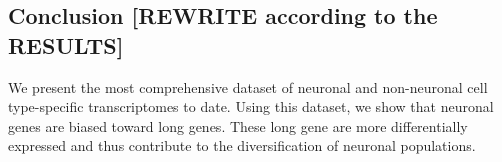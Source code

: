 \subsection{Conclusion [REWRITE according to the RESULTS]}
We present the most comprehensive dataset of neuronal and non-neuronal cell type-specific transcriptomes to date. Using this dataset, we show that neuronal genes are biased toward long genes. These long gene are more differentially expressed and thus contribute to the diversification of neuronal populations.
